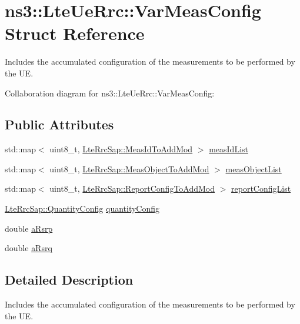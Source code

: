 \hypertarget{structns3_1_1LteUeRrc_1_1VarMeasConfig}{}\section{ns3\+:\+:Lte\+Ue\+Rrc\+:\+:Var\+Meas\+Config Struct Reference}
\label{structns3_1_1LteUeRrc_1_1VarMeasConfig}


Includes the accumulated configuration of the measurements to be performed by the UE.  




Collaboration diagram for ns3\+:\+:Lte\+Ue\+Rrc\+:\+:Var\+Meas\+Config\+:
\subsection*{Public Attributes}
\begin{DoxyCompactItemize}
\item 
std\+::map$<$ uint8\+\_\+t, \hyperlink{structns3_1_1LteRrcSap_1_1MeasIdToAddMod}{Lte\+Rrc\+Sap\+::\+Meas\+Id\+To\+Add\+Mod} $>$ \hyperlink{structns3_1_1LteUeRrc_1_1VarMeasConfig_aa7ad91f943892cec48ffa9a5ae872e8c}{meas\+Id\+List}
\item 
std\+::map$<$ uint8\+\_\+t, \hyperlink{structns3_1_1LteRrcSap_1_1MeasObjectToAddMod}{Lte\+Rrc\+Sap\+::\+Meas\+Object\+To\+Add\+Mod} $>$ \hyperlink{structns3_1_1LteUeRrc_1_1VarMeasConfig_a79928885aabfe13a4d88e5d31233fac3}{meas\+Object\+List}
\item 
std\+::map$<$ uint8\+\_\+t, \hyperlink{structns3_1_1LteRrcSap_1_1ReportConfigToAddMod}{Lte\+Rrc\+Sap\+::\+Report\+Config\+To\+Add\+Mod} $>$ \hyperlink{structns3_1_1LteUeRrc_1_1VarMeasConfig_a3ebdd65b8ad3393b5e869599e2a0afff}{report\+Config\+List}
\item 
\hyperlink{structns3_1_1LteRrcSap_1_1QuantityConfig}{Lte\+Rrc\+Sap\+::\+Quantity\+Config} \hyperlink{structns3_1_1LteUeRrc_1_1VarMeasConfig_a5e1c86a9be1d9117b9ebca85442ea36e}{quantity\+Config}
\item 
double \hyperlink{structns3_1_1LteUeRrc_1_1VarMeasConfig_ae27b8f0c85f0d02a4d9ee4a397806bff}{a\+Rsrp}
\item 
double \hyperlink{structns3_1_1LteUeRrc_1_1VarMeasConfig_a3b110446d230054a65aeeeff4fda2fe3}{a\+Rsrq}
\end{DoxyCompactItemize}


\subsection{Detailed Description}
Includes the accumulated configuration of the measurements to be performed by the UE. 

